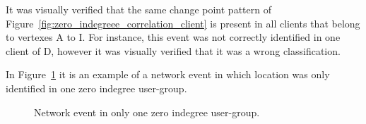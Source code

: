 It was visually verified that the same change point pattern of
Figure~\ref{fig:zero_indegreee_correlation_client} is present in all clients
that belong to vertexes A to I. For instance, this event was not correctly
identified in one client of D, however it was visually verified that it was a
wrong classification.

In Figure~\ref{fig:zero_indegreee_without_correlation} it is an example of a
network event in which location was only identified in one zero indegree
user-group.

\begin{figure}[H]
    \centering
    \caption{Network event in only one zero indegree user-group.}
\label{fig:zero_indegreee_without_correlation}
\end{figure}%

